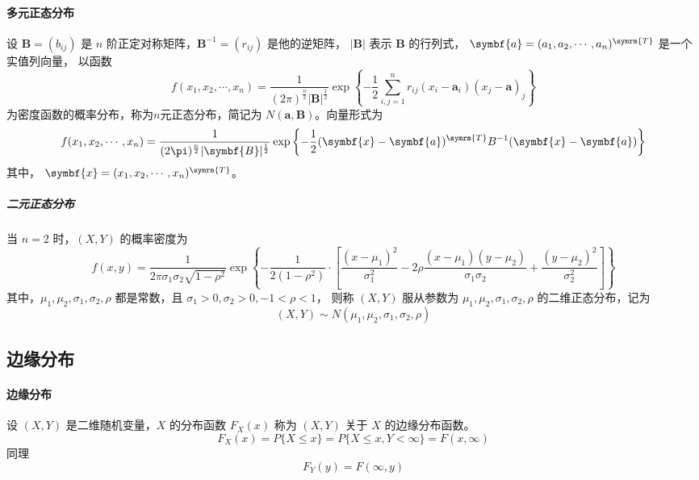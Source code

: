 \paragraph{多元正态分布} 设 $ \symbf{B} = (b_{ij}) $ 是 $ n $ 阶正定对称矩阵，$ \symbf{B}^{-1} = (r_{ij}) $ 是他的逆矩阵，
$ |\symbf{B}| $ 表示 $ \symbf{B} $ 的行列式， $ \symbf{a} = (a_{1} , a_{2} , \cdots , a_{n})^{\symrm{T}} $ 是一个实值列向量，
以函数
\begin{equation}
    f(x_{1}, x_{2}, \cdots, x_{n} ) = \frac{1}{(2\pi)^{\frac{n}{2}} |\symbf{B}|^{\frac{1}{2}}}
    \exp \left\{ -\frac{1}{2} \sum_{i,j=1}^n r_{ij} (x_i - \symbf{a}_i)(x_j - \symbf{a})_j \right\}
\end{equation}
为密度函数的概率分布，称为$ n $元正态分布，简记为 $ N(\symbf{a},\symbf{B}) $。向量形式为
\begin{equation}
    f(x_{1}, x_{2}, \cdots, x_{n} ) = \frac{1}{(2\pi)^{\frac{n}{2}} |\symbf{B}|^{\frac{1}{2}}}
    \exp \left\{ -\frac{1}{2} (\symbf{x} - \symbf{a})^{\symrm{T}} B^{-1} (\symbf{x} - \symbf{a}) \right\}
\end{equation}
其中， $ \symbf{x} = (x_{1}, x_{2}, \cdots, x_{n})^{\symrm{T}} $。

\subparagraph{二元正态分布} 当 $ n=2 $ 时，$ (X,Y) $ 的概率密度为
\begin{equation}
    f(x,y) = \frac{1}{2\pi \sigma_1 \sigma_2 \sqrt{1-\rho^2}}
    \exp \left\{ -\frac{1}{2(1-\rho^2)} \cdot
    \left[ \frac{(x-\mu_1)^2}{\sigma_1^2} -2\rho \frac{(x-\mu_1)(y-\mu_2)}{\sigma_1\sigma_2} + \frac{(y-\mu_2)^2}{\sigma_2^2} \right]
    \right\}
\end{equation}
其中，$ \mu_1, \mu_2, \sigma_1, \sigma_2, \rho $ 都是常数，且 $ \sigma_1 > 0, \sigma_2 > 0, -1 < \rho < 1 $，
则称 $ (X,Y) $ 服从参数为 $ \mu_1, \mu_2, \sigma_1, \sigma_2, \rho $ 的二维正态分布，记为
$$ (X,Y) \sim N(\mu_1, \mu_2, \sigma_1, \sigma_2, \rho) $$

\subsection{边缘分布}

\paragraph{边缘分布} 设 $ (X,Y) $ 是二维随机变量，$ X $ 的分布函数 $ F_X(x) $ 称为 $ (X,Y) $ 关于 $ X $ 的边缘分布函数。
$$ F_X(x) = P\{ X \leqslant x \} = P\{ X \leqslant x, Y < \infty \} = F(x,\infty) $$
同理 $$ F_Y(y) = F(\infty,y) $$

